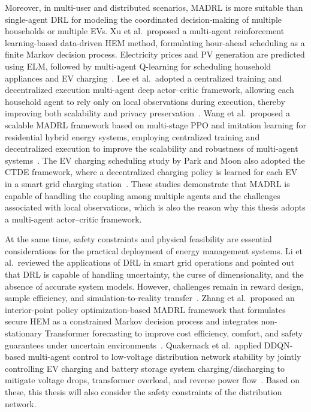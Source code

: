 Moreover, in multi-user and distributed scenarios, MADRL is more suitable than single-agent DRL for modeling the coordinated decision-making of multiple households or multiple EVs. Xu et al.\ proposed a multi-agent reinforcement learning-based data-driven HEM method, formulating hour-ahead scheduling as a finite Markov decision process. Electricity prices and PV generation are predicted using ELM, followed by multi-agent Q-learning for scheduling household appliances and EV charging~\parencite{8981876}. Lee et al.\ adopted a centralized training and decentralized execution multi-agent deep actor--critic framework, allowing each household agent to rely only on local observations during execution, thereby improving both scalability and privacy preservation~\parencite{9302935}. Wang et al.\ proposed a scalable MADRL framework based on multi-stage PPO and imitation learning for residential hybrid energy systems, employing centralized training and decentralized execution to improve the scalability and robustness of multi-agent systems~\parencite{WANG2024123414}. The EV charging scheduling study by Park and Moon also adopted the CTDE framework, where a decentralized charging policy is learned for each EV in a smart grid charging station~\parencite{PARK2022120111}. These studies demonstrate that MADRL is capable of handling the coupling among multiple agents and the challenges associated with local observations, which is also the reason why this thesis adopts a multi-agent actor--critic framework.

At the same time, safety constraints and physical feasibility are essential considerations for the practical deployment of energy management systems. Li et al.\ reviewed the applications of DRL in smart grid operations and pointed out that DRL is capable of handling uncertainty, the curse of dimensionality, and the absence of accurate system models. However, challenges remain in reward design, sample efficiency, and simulation-to-reality transfer~\parencite{10241311}. Zhang et al.\ proposed an interior-point policy optimization-based MADRL framework that formulates secure HEM as a constrained Markov decision process and integrates non-stationary Transformer forecasting to improve cost efficiency, comfort, and safety guarantees under uncertain environments~\parencite{ZHANG2024124155}. Quakernack et al.\ applied DDQN-based multi-agent control to low-voltage distribution network stability by jointly controlling EV charging and battery storage system charging/discharging to mitigate voltage drops, transformer overload, and reverse power flow~\parencite{9960416}. Based on these, this thesis will also consider the safety constraints of the distribution network.


